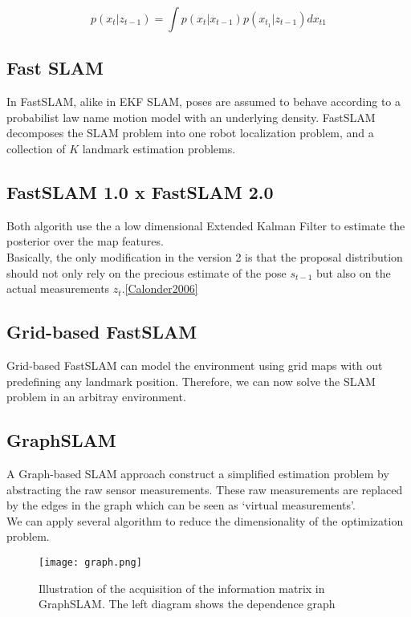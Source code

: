 \documentclass[10pt,journal,compsoc]{IEEEtran}
\begin{document}
\begin{equation}

  p(x_t|z_{t-1}) = \int p(x_t| x_{t-1}) p(x_{t_1}|z_{t-1}) dx_{t1}

\end{equation}

\subsection{Fast SLAM}

In FastSLAM, alike in EKF SLAM, poses are assumed to behave according to a probabilist law name motion model with an
underlying density. FastSLAM decomposes the SLAM problem into one robot localization problem, and a collection of $K$
landmark estimation problems.

\subsection{FastSLAM 1.0 x FastSLAM 2.0}

Both algorith use the a low dimensional Extended Kalman Filter to estimate the posterior over the map features.\\
Basically, the only modification in the version 2 is that the proposal distribution should not only rely on the precious
estimate of the pose $s_{t-1}$ but also on the actual measurements $z_t$.\ref{Calonder2006}

\subsection{Grid-based FastSLAM}
Grid-based FastSLAM can model the environment using grid maps with out predefining any landmark position. Therefore, we
can now solve the SLAM problem in an arbitray environment.

\subsection{GraphSLAM}

A Graph-based SLAM approach construct a simplified estimation problem by abstracting the raw sensor measurements. These
raw measurements are replaced by the edges in the graph which can be seen as `virtual measurements'.\\
We can apply several algorithm to reduce the dimensionality of the optimization problem.\cite{Thrun2006a}

\begin{figure}[thpb]
      \centering
      \texttt{[image: graph.png]}
      \caption{Illustration of the acquisition of the information matrix in GraphSLAM. The left diagram shows the
      dependence graph \cite{Thrun2006a}}
      \label{fig:graph}
\end{figure}
\end{document}
